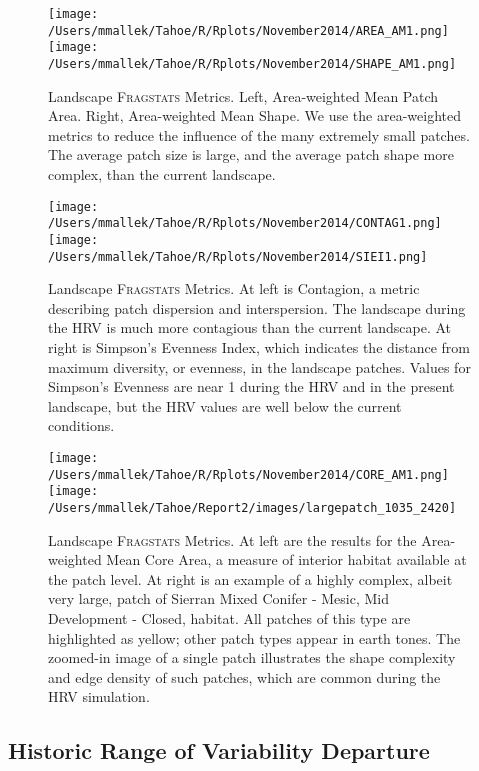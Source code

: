\begin{figure}
\texttt{[image: /Users/mmallek/Tahoe/R/Rplots/November2014/AREA\_AM1.png]}
\texttt{[image: /Users/mmallek/Tahoe/R/Rplots/November2014/SHAPE\_AM1.png]}
\caption{Landscape \textsc{Fragstats} Metrics. Left, Area-weighted Mean Patch Area. Right, Area-weighted Mean Shape. We use the area-weighted metrics to reduce the influence of the many extremely small patches. The average patch size is large, and the average patch shape more complex, than the current landscape.} 
\label{landscapestory1}
\end{figure}

\begin{figure}
\texttt{[image: /Users/mmallek/Tahoe/R/Rplots/November2014/CONTAG1.png]}
\texttt{[image: /Users/mmallek/Tahoe/R/Rplots/November2014/SIEI1.png]}
\caption{Landscape \textsc{Fragstats} Metrics. At left is Contagion, a metric describing patch dispersion and interspersion. The landscape during the HRV is much more contagious than the current landscape. At right is Simpson's Evenness Index, which indicates the distance from maximum diversity, or evenness, in the landscape patches. Values for Simpson's Evenness are near 1 during the HRV and in the present landscape, but the HRV values are well below the current conditions.} 
\label{landscapestory2}
\end{figure}

\begin{figure}
\texttt{[image: /Users/mmallek/Tahoe/R/Rplots/November2014/CORE\_AM1.png]}
\texttt{[image: /Users/mmallek/Tahoe/Report2/images/largepatch\_1035\_2420]}
\caption{Landscape \textsc{Fragstats} Metrics. At left are the results for the Area-weighted Mean Core Area, a measure of interior habitat available at the patch level. At right is an example of a highly complex, albeit very large, patch of Sierran Mixed Conifer - Mesic, Mid Development - Closed, habitat. All patches of this type are highlighted as yellow; other patch types appear in earth tones. The zoomed-in image of a single patch illustrates the shape complexity and edge density of such patches, which are common during the HRV simulation.} 
\label{landscapestory3}
\end{figure}

\subsection{Historic Range of Variability Departure}

